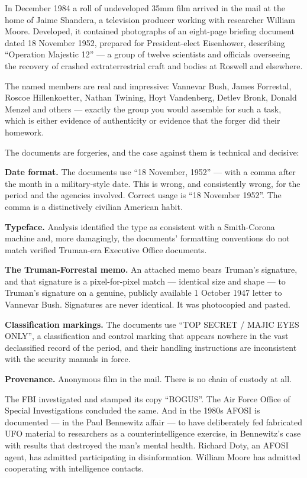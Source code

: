In December 1984 a roll of undeveloped 35mm film arrived in the mail at the home of Jaime
Shandera, a television producer working with researcher William Moore. Developed, it contained
photographs of an eight-page briefing document dated 18 November 1952, prepared for
President-elect Eisenhower, describing ``Operation Majestic 12'' --- a group of twelve
scientists and officials overseeing the recovery of crashed extraterrestrial craft and bodies at
Roswell and elsewhere.

The named members are real and impressive: Vannevar Bush, James Forrestal, Roscoe Hillenkoetter,
Nathan Twining, Hoyt Vandenberg, Detlev Bronk, Donald Menzel and others --- exactly the group
you would assemble for such a task, which is either evidence of authenticity or evidence that
the forger did their homework.

The documents are forgeries, and the case against them is technical and decisive:

\textbf{Date format.} The documents use ``18 November, 1952'' --- with a comma after the month
in a military-style date. This is wrong, and consistently wrong, for the period and the
agencies involved. Correct usage is ``18 November 1952''. The comma is a distinctively civilian
American habit.

\textbf{Typeface.} Analysis identified the type as consistent with a Smith-Corona machine and,
more damagingly, the documents' formatting conventions do not match verified Truman-era
Executive Office documents.

\textbf{The Truman-Forrestal memo.} An attached memo bears Truman's signature, and that
signature is a pixel-for-pixel match --- identical size and shape --- to Truman's signature on
a genuine, publicly available 1 October 1947 letter to Vannevar Bush. Signatures are never
identical. It was photocopied and pasted.

\textbf{Classification markings.} The documents use ``TOP SECRET / MAJIC EYES ONLY'', a
classification and control marking that appears nowhere in the vast declassified record of the
period, and their handling instructions are inconsistent with the security manuals in force.

\textbf{Provenance.} Anonymous film in the mail. There is no chain of custody at all.

The FBI investigated and stamped its copy ``BOGUS''. The Air Force Office of Special
Investigations concluded the same. And in the 1980s AFOSI is documented --- in the Paul
Bennewitz affair --- to have deliberately fed fabricated UFO material to researchers as a
counterintelligence exercise, in Bennewitz's case with results that destroyed the man's mental
health. Richard Doty, an AFOSI agent, has admitted participating in disinformation. William
Moore has admitted cooperating with intelligence contacts.

